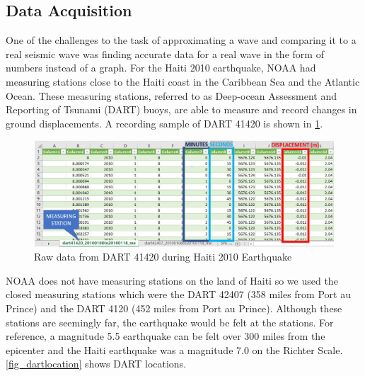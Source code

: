 \documentclass[conf]{new-aiaa}
\begin{document}
\subsection{Data Acquisition}
One of the challenges to the task of approximating a wave and comparing it to a real seismic wave was finding accurate data for a real wave in the form of numbers instead of a graph. For the Haiti 2010 earthquake, NOAA had measuring stations close to the Haiti coast in the Caribbean Sea and the Atlantic Ocean. These measuring stations, referred to as Deep-ocean Assessment and Reporting of Tsunami (DART) buoys, are able to measure and record changes in ground displacements. A recording sample of DART 41420 is shown in \cref{fig_dart41420}.
\begin{figure}[H]
    \begin{center}
    \includegraphics[width =1\linewidth]{figures/XCEL DATA.PNG}
    \caption{Raw data from DART 41420 during Haiti 2010 Earthquake}
    \label{fig_dart41420}
    \end{center}
\end{figure}

NOAA does not have measuring stations on the land of Haiti so we used the closed measuring stations which were the DART 42407 (358 miles from Port au Prince) and the DART 4120 (452 miles from Port au Prince). Although these stations are seemingly far, the earthquake would be felt at the stations. For reference, a magnitude 5.5 earthquake can be felt over 300 miles from the epicenter and the Haiti earthquake was a magnitude 7.0 on the Richter Scale.\cref{fig_dartlocation} shows DART locations.
\end{document}
